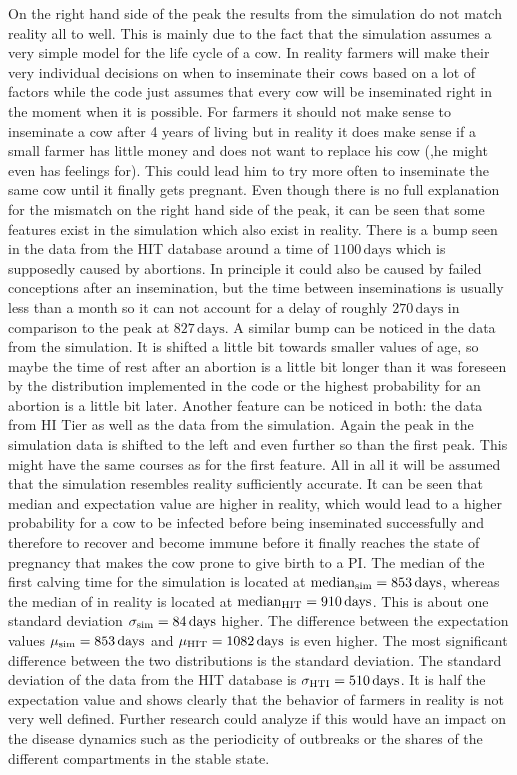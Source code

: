 On the right hand side of the peak the results from the simulation do not match reality all to well. This is mainly due to the fact that the simulation assumes a very simple model for the life cycle of a cow. In reality farmers will make their very individual decisions on when to inseminate their cows based on a lot of factors while the code just assumes that every cow will be inseminated right in the moment when it is possible. For farmers it should not make sense to inseminate a cow after 4 years of living but in reality it does make sense if a small farmer has little money and does not want to replace his cow (,he might even has feelings for). This could lead him to try more often to inseminate the same cow until it finally gets pregnant. 
Even though there is no full explanation for the mismatch on the right hand side of the peak, it can be seen that some features exist in the simulation which also exist in reality. There is a bump seen in the data from the HIT database around a time of $1100\,\text{days}$ which is supposedly caused by abortions. In principle it could also be caused by failed conceptions after an insemination, but the time between inseminations is usually less than a month so it can not account for a delay of roughly $270\,\text{days}$ in comparison to the peak at $827\,\text{days}$. 
A similar bump can be noticed in the data from the simulation. It is shifted a little bit towards smaller values of age, so maybe the time of rest after an abortion is a little bit longer than it was foreseen by the distribution implemented in the code or the highest probability for an abortion is a little bit later. Another feature can be noticed in both: the data from HI Tier as well as the data from the simulation. Again the peak in the simulation data is shifted to the left and even further so than the first peak. This might have the same courses as for the first feature.
All in all it will be assumed that the simulation resembles reality sufficiently accurate. It can be seen that median and expectation value are higher in reality, which would lead to a higher probability for a cow to be infected before being inseminated successfully and therefore to recover and become immune before it finally reaches the state of pregnancy that makes the cow prone to give birth to a PI. The median of the first calving time for the simulation is located at $\text{median}_\text{sim}=853\,\text{days} $, whereas the median of in reality is located at $\text{median}_\text{HIT}=910\,\text{days}$. This is about one standard deviation $\sigma_\text{sim} = 84\,\text{days}$ higher. The difference between the expectation values $\mu_\text{sim}=853\,\text{days}$ and $\mu_\text{HIT}=1082\,\text{days}$ is even higher. The most significant difference between the two distributions is the standard deviation. The standard deviation of the data from the HIT database is $\sigma_\text{HTI}=510\,\text{days}$. It is half the expectation value and shows clearly that the behavior of farmers in reality is not very well defined. Further research could analyze if this would have an impact on the disease dynamics such as the periodicity of outbreaks or the shares of the different compartments in the stable state. 
